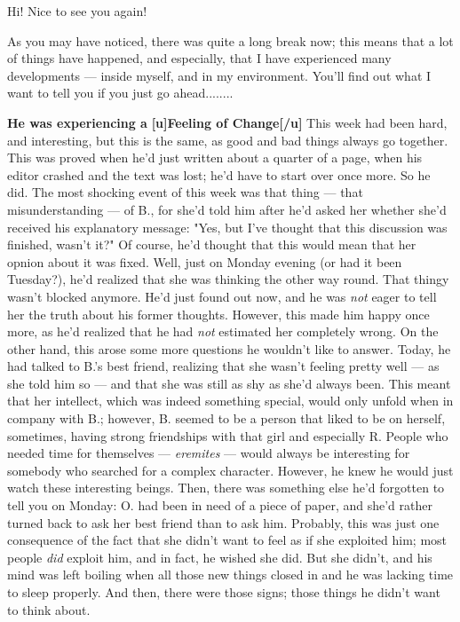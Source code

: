 Hi! Nice to see you again!

As you may have noticed, there was quite a long break now; this means that a lot of things have happened, and especially, that I have experienced many developments --- inside myself, and in my environment. You'll find out what I want to tell you if you just go ahead........

\textbf{He was experiencing a}
\textbf{[u]Feeling of Change[/u]}
This week had been hard, and interesting, but this is the same, as good and bad things always go together. This was proved when he'd just written about a quarter of a page, when his editor crashed and the text was lost; he'd have to start over once more. So he did. 
The most shocking event of this week was that thing --- that misunderstanding --- of B., for she'd told him after he'd asked her whether she'd received his explanatory message: "Yes, but I've thought that this discussion was finished, wasn't it?"
Of course, he'd thought that this would mean that her opnion about it was fixed. 
Well, just on Monday evening (or had it been Tuesday?), he'd realized that she was thinking the other way round. 
That thingy wasn't blocked anymore. 
He'd just found out now, and he was \emph{not} eager to tell her the truth about his former thoughts. However, this made him happy once more, as he'd realized that he had \emph{not} estimated her completely wrong. 
On the other hand, this arose some more questions he wouldn't like to answer. 
Today, he had talked to B.'s best friend, realizing that she wasn't feeling pretty well --- as she told him so --- and that she was still as shy as she'd always been. This meant that her intellect, which was indeed something special, would only unfold when in company with B.; however, B. seemed to be a person that liked to be on herself, sometimes, having strong friendships with that girl and especially R. 
People who needed time for themselves --- \emph{eremites} --- would always be interesting for somebody who searched for a complex character. However, he knew he would just watch these interesting beings. 
Then, there was something else he'd forgotten to tell you on Monday: O. had been in need of a piece of paper, and she'd rather turned back to ask her best friend than to ask him. 
Probably, this was just one consequence of the fact that she didn't want to feel as if she exploited him; most people \emph{did} exploit him, and in fact, he wished she did. 
But she didn't, and his mind was left boiling when all those new things closed in and he was lacking time to sleep properly. And then, there were those signs; those things he didn't want to think about. 
